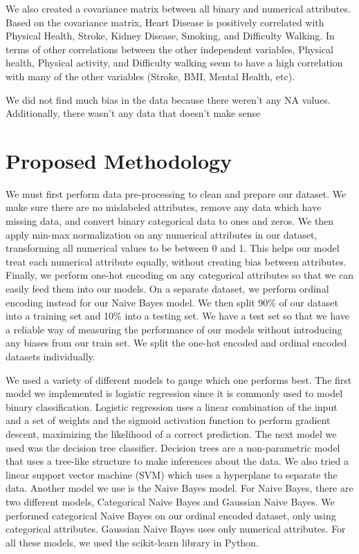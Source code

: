 \documentclass[a4paper]{article}
\begin{document}
We also created a covariance matrix between all binary and numerical attributes. Based on the covariance matrix, Heart Disease is positively correlated with Physical Health, Stroke, Kidney Disease, Smoking, and Difficulty Walking. In terms of other correlations between the other independent variables, Physical health, Physical activity, and Difficulty walking seem to have a high correlation with many of the other variables (Stroke, BMI, Mental Health, etc). 

We did not find much bias in the data because there weren’t any NA values. Additionally, there wasn’t any data that doesn’t make sense


\section{Proposed Methodology}

We must first perform data pre-processing to clean and prepare our dataset. We make sure there are no mislabeled attributes, remove any data which have missing data, and convert binary categorical data to ones and zeros. We then apply min-max normalization on any numerical attributes in our dataset, transforming all numerical values to be between 0 and 1. This helps our model treat each numerical attribute equally, without creating bias between attributes. Finally, we perform one-hot encoding on any categorical attributes so that we can easily feed them into our models. On a separate dataset, we perform ordinal encoding instead for our Naive Bayes model.
We then split 90\% of our dataset into a training set and 10\% into a testing set. We have a test set so that we have a reliable way of measuring the performance of our models without introducing any biases from our train set. We split the one-hot encoded and ordinal encoded datasets individually. 
	
We used a variety of different models to gauge which one performs best. The first model we implemented is logistic regression since it is commonly used to model binary classification. Logistic regression uses a linear combination of the input and a set of weights and the sigmoid activation function to perform gradient descent, maximizing the likelihood of a correct prediction. The next model we used was the decision tree classifier. Decision trees are a non-parametric model that uses a tree-like structure to make inferences about the data. We also tried a linear support vector machine (SVM) which uses a hyperplane to separate the data. Another model we use is the Naive Bayes model. For Naive Bayes, there are two different models, Categorical Naive Bayes and Gaussian Naive Bayes. We performed categorical Naive Bayes on our ordinal encoded dataset, only using categorical attributes. Gaussian Naive Bayes uses only numerical attributes. For all these models, we used the scikit-learn library in Python.
\end{document}
